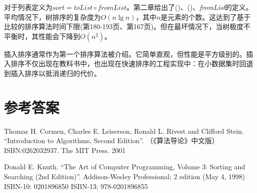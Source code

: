 \documentclass[b5paper]{ctexart}
\begin{document}
对于列表定义为$sort = toList \circ \textit{fromList}$。第二章给出了()、()、\textit{fromList}的定义。平均情况下，树排序的复杂度为$O(n \lg n)$，其中$n$是元素的个数。这达到了基于比较的排序算法时间下限(\cite{Knuth-V3}第180-193页、\cite{CLRS}第167页)。但在最坏情况下，当树极度不平衡时，其性能会下降到$O(n^2)$。

插入排序通常作为第一个排序算法被介绍。它简单直观，但性能是平方级别的。插入排序不仅出现在教科书中，也出现在快速排序的工程实现中：在小数据集时回退到插入排序以抵消递归的代价。

\ifx\wholebook\relax \else
\section{参考答案}
\shipoutAnswer

\begin{thebibliography}{99}

Thomas H. Cormen, Charles E. Leiserson, Ronald L. Rivest and Clifford Stein.
``Introduction to Algorithms, Second Edition''. （《算法导论》中文版）ISBN:0262032937. The MIT Press. 2001

Donald E. Knuth. ``The Art of Computer Programming, Volume 3: Sorting and Searching (2nd Edition)''. Addison-Wesley Professional; 2 edition (May 4, 1998) ISBN-10: 0201896850 ISBN-13: 978-0201896855

\end{thebibliography}
\end{document}
